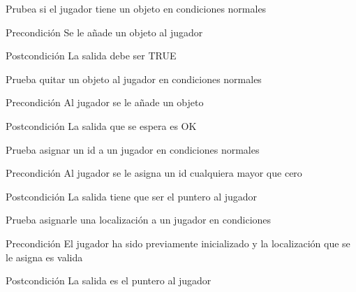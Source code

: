 \begin{DoxyRefList}
\item[\label{test__test000233}%
\hypertarget{test__test000233}{}%
Global \hyperlink{player__test_8c_abedc0e75ebffb4e7224f5e5ac0ee3055}{test1\-\_\-player\-\_\-has\-\_\-object} ()]Prubea si el jugador tiene un objeto en condiciones normales \begin{DoxyPrecond}{Precondición}
Se le añade un objeto al jugador 
\end{DoxyPrecond}
\begin{DoxyPostcond}{Postcondición}
La salida debe ser T\-R\-U\-E  
\end{DoxyPostcond}

\item[\label{test__test000225}%
\hypertarget{test__test000225}{}%
Global \hyperlink{player__test_8c_a0685839b423f685dcdabb7b9fe411cd1}{test1\-\_\-player\-\_\-remove\-\_\-object} ()]Prueba quitar un objeto al jugador en condiciones normales \begin{DoxyPrecond}{Precondición}
Al jugador se le añade un objeto 
\end{DoxyPrecond}
\begin{DoxyPostcond}{Postcondición}
La salida que se espera es O\-K  
\end{DoxyPostcond}

\item[\label{test__test000207}%
\hypertarget{test__test000207}{}%
Global \hyperlink{player__test_8c_a64fa15a235953bea694236b9d7841cbc}{test1\-\_\-player\-\_\-set\-\_\-id} ()]Prueba asignar un id a un jugador en condiciones normales \begin{DoxyPrecond}{Precondición}
Al jugador se le asigna un id cualquiera mayor que cero 
\end{DoxyPrecond}
\begin{DoxyPostcond}{Postcondición}
La salida tiene que ser el puntero al jugador  
\end{DoxyPostcond}

\item[\label{test__test000210}%
\hypertarget{test__test000210}{}%
Global \hyperlink{player__test_8c_aec6799a4f46c3f3c471fcb668addcad4}{test1\-\_\-player\-\_\-set\-\_\-location} ()]Prueba asignarle una localización a un jugador en condiciones \begin{DoxyPrecond}{Precondición}
El jugador ha sido previamente inicializado y la localización que se le asigna es valida 
\end{DoxyPrecond}
\begin{DoxyPostcond}{Postcondición}
La salida es el puntero al jugador  
\end{DoxyPostcond}


\end{DoxyRefList}
